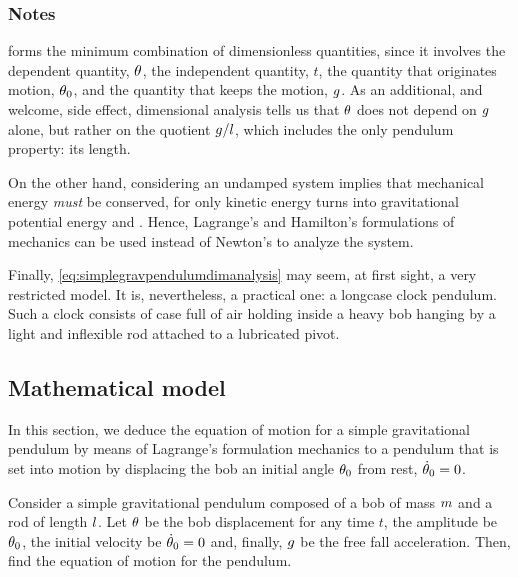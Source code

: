 \subsubsection{Notes}
 forms the minimum combination of dimensionless quantities, since it involves the dependent quantity, $\theta$, the independent quantity, $t$, the quantity that originates motion, $\theta_0$, and the quantity that keeps the motion, $g$. As an additional, and welcome, side effect, dimensional analysis tells us that $\theta$ does not depend on $g$ alone, but rather on the quotient $g/l$, which includes the only pendulum property: its length.

On the other hand, considering an undamped system implies that mechanical energy \emph{must} be conserved, for only kinetic energy turns into gravitational potential energy and \vis. Hence, Lagrange's and Hamilton's formulations of mechanics can be used instead of Newton's to analyze the system.

Finally, \cref{eq:simplegravpendulumdimanalysis} may seem, at first sight, a very restricted model. It is, nevertheless, a practical one: a longcase clock pendulum. Such a clock consists of case full of air holding inside a heavy bob hanging by a light and inflexible rod attached to a lubricated pivot.


\subsection{Mathematical model}\label{subsec:mathmodel}
In this section, we deduce the equation of motion for a simple gravitational pendulum by means of Lagrange's formulation mechanics to a pendulum that is set into motion by displacing the bob an initial angle $\theta_0$ from rest, $\dot{\theta}_0 = 0$.

Consider a simple gravitational pendulum composed of a bob of mass $m$ and a rod of length $l$. Let $\theta$ be the bob displacement for any time $t$, the amplitude be $\theta_0$, the initial velocity be $\dot{\theta}_0 = 0$ and, finally, $g$ be the free fall acceleration. Then, find the equation of motion for the pendulum.

